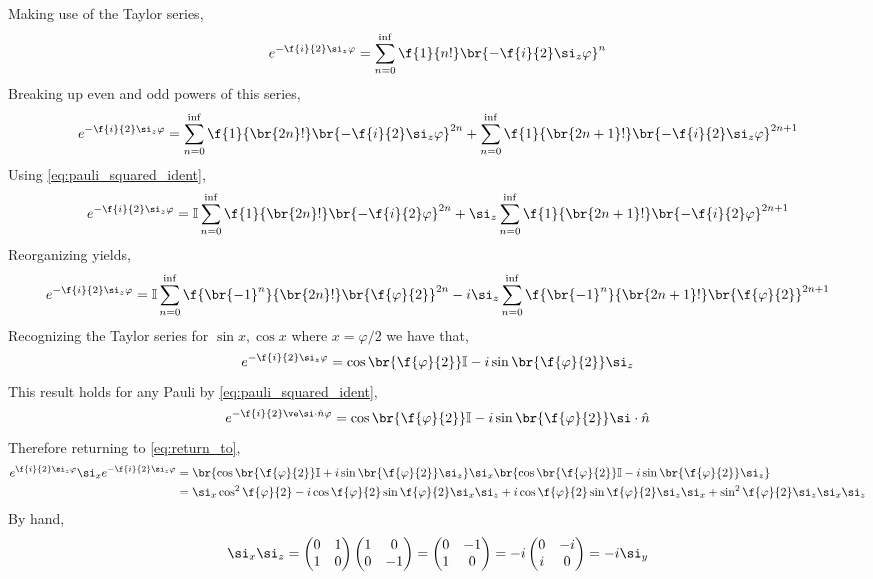 \documentclass{article}
\begin{document}
Making use of the Taylor series,
\[ e^{-\f{i}{2} \si_z \varphi} = \sum_{n=0}^{\inf} \f{1}{n!}\br{-\f{i}{2} \si_z \varphi }^n \]
Breaking up even and odd powers of this series,
\[ e^{-\f{i}{2} \si_z \varphi} = \sum_{n=0}^{\inf} \f{1}{\br{2n}!}\br{-\f{i}{2} \si_z \varphi }^{2n} + \sum_{n=0}^{\inf} \f{1}{\br{2n + 1}!}\br{-\f{i}{2} \si_z \varphi }^{2n + 1} \]
Using \cref{eq:pauli_squared_ident},
\[ e^{-\f{i}{2} \si_z \varphi} = \mathbb{I} \sum_{n=0}^{\inf} \f{1}{\br{2n}!}\br{-\f{i}{2} \varphi }^{2n} + \si_z\sum_{n=0}^{\inf} \f{1}{\br{2n + 1}!}\br{-\f{i}{2} \varphi }^{2n + 1} \]
Reorganizing yields,
\[ e^{-\f{i}{2} \si_z \varphi} = \mathbb{I} \sum_{n=0}^{\inf} \f{\br{-1}^n}{\br{2n}!}\br{\f{\varphi}{2}  }^{2n} - i \si_z\sum_{n=0}^{\inf} \f{\br{-1}^n}{\br{2n + 1}!}\br{\f{\varphi}{2}}^{2n + 1} \]
Recognizing the Taylor series for $\sin x, \cos x$ where $x = \varphi / 2$ we have that,
\[ e^{-\f{i}{2} \si_z \varphi} =  \cos\br{\f{\varphi}{2}}\mathbb{I} - i \sin\br{\f{\varphi}{2}} \si_z \]
This result holds for any Pauli by \cref{eq:pauli_squared_ident},
\[ e^{-\f{i}{2} \ve \si \cdot \hat n \varphi} =  \cos\br{\f{\varphi}{2}}\mathbb{I} - i \sin\br{\f{\varphi}{2}} \si \cdot \hat n \]
Therefore returning to \cref{eq:return_to},
\begin{align*}
    e^{\f{i}{2} \si_z \varphi } \si_x e^{-\f{i}{2} \si_z \varphi } &=
    \br{\cos\br{\f{\varphi}{2}}\mathbb{I} + i \sin\br{\f{\varphi}{2}} \si_z} \si_x \br{\cos\br{\f{\varphi}{2}}\mathbb{I} - i \sin\br{\f{\varphi}{2}} \si_z} \\
    &= \si_x \cos^2 \f{\varphi}{2} - i \cos \f{\varphi}{2} \sin \f{\varphi}{2} \si_x \si_z + i \cos \f{\varphi}{2} \sin \f{\varphi}{2} \si_z \si_x + \sin^2 \f{\varphi}{2} \si_z \si_x \si_z
\end{align*}
By hand,
\[ \si_x \si_z = \begin{pmatrix}0 & 1 \\ 1 & 0 \end{pmatrix}\begin{pmatrix}1 & 0 \\ 0 & -1 \end{pmatrix} = \begin{pmatrix}0 & -1 \\ 1 & 0 \end{pmatrix} = -i\begin{pmatrix}0 & -i \\ i & 0 \end{pmatrix} = -i \si_y\]
\end{document}
